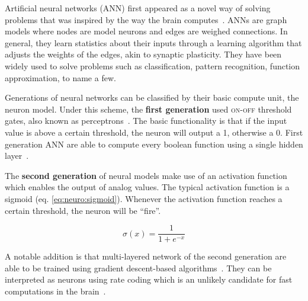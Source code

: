 Artificial neural networks (ANN) first appeared as a novel way of solving problems that was inspired by the way the brain computes~\cite{mcculloch1943logical}. ANNs are graph models where nodes are model neurons and edges are weighed connections. In general, they learn statistics about their inputs through a learning algorithm that adjusts the weights of the edges, akin to synaptic plasticity. They have been widely used to solve problems such as classification, pattern recognition, function approximation, to name a few.

Generations of neural networks can be classified by their basic compute unit, the neuron model. Under this scheme, the \textbf{first generation} used \textsc{on-off} threshold gates, also known as perceptrons~\cite{minsky1987perceptrons}. The basic functionality is that if the input value is above a certain threshold, the neuron will output a 1, otherwise a 0. First generation ANN are able to compute every boolean function using a single hidden layer~\cite{third-gen-nn-Maass1997}.

The \textbf{second generation} of neural models make use of an activation function which enables the output of analog values. The typical activation function is a sigmoid (eq. \ref{eq:neuro:sigmoid}). Whenever the activation function reaches a certain threshold, the neuron will be ``fire''.

\begin{equation}
  \sigma(x) = \frac{1}{1 + e^{-x}}
  \label{eq:neuro:sigmoid}
\end{equation}
\vspace*{0.1cm}

A notable addition is that multi-layered network of the second generation are able to be trained using gradient descent-based algorithms~\cite{hecht1989-backprop-theory}. They can be interpreted as neurons using rate coding which is an unlikely candidate for fast computations in the brain~\cite{third-gen-nn-Maass1997}.

